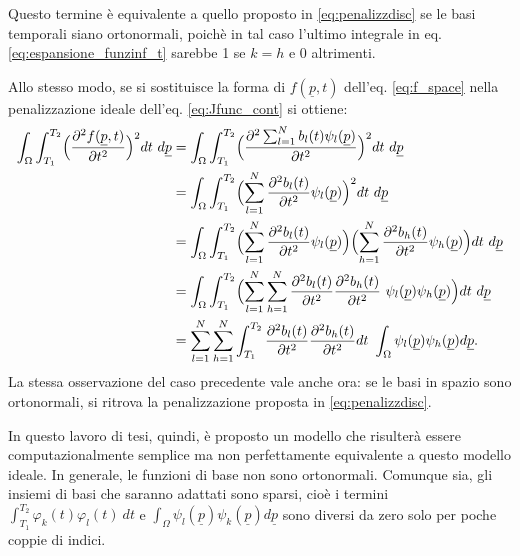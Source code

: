 \documentclass[a4paper,11pt,twoside,openright]{book}							%
\begin{document}
Questo termine è equivalente a quello proposto in \ref{eq:penalizzdisc} se le basi temporali siano ortonormali, poichè in tal caso l'ultimo integrale in eq. \ref{eq:espansione_funzinf_t} sarebbe 1 se $k=h$ e 0 altrimenti.

Allo stesso modo, se si sostituisce la forma di $f(\underline p,t)$ dell'eq. \ref{eq:f_space} nella penalizzazione ideale dell'eq. \ref{eq:Jfunc_cont} si ottiene:
\begin{equation} 
\label{eq:espansione_funzinf_sp}
\begin{split}
\int_\Omega \int_{T_1}^{T_2} \Bigl( \frac{\partial^2 f(\underline p, t) }{\partial t ^2} \Bigr)^2 dt\ d\underline p 
&=\int_\Omega \int_{T_1}^{T_2} \Bigl( \frac{\partial^2 \sum_{l=1}^N b_l(t)\psi_l(\underline p) }{\partial t ^2} \Bigr)^2 dt\ d\underline p \\
&=\int_\Omega \int_{T_1}^{T_2} \Bigl( \sum_{l=1}^N \frac{ \partial^2b_l(t)}{\partial t ^2}\psi_l(\underline p)  \Bigr)^2 dt\ d\underline p  \\
&=\int_\Omega \int_{T_1}^{T_2} \Bigl( \sum_{l=1}^N \frac{ \partial^2b_l(t)}{\partial t ^2}\psi_l(\underline p)  \Bigr)\Bigl( \sum_{h=1}^N \frac{ \partial^2b_h(t)}{\partial t ^2}\psi_h(\underline p)  \Bigr) dt\ d\underline p \\
&= \int_\Omega \int_{T_1}^{T_2} \Bigl( \sum_{l=1}^N \sum_{h=1}^N \frac{ \partial^2b_l(t)}{\partial t ^2}\frac{ \partial^2b_h(t)}{\partial t ^2}\   \psi_l(\underline p)  \psi_h(\underline p)  \Bigr) dt\ d\underline p \\
&=\sum_{l=1}^N \sum_{h=1}^N  \int_{T_1}^{T_2}  \frac{ \partial^2b_l(t)}{\partial t ^2}\frac{ \partial^2b_h(t)}{\partial t ^2}dt\  \int_\Omega \psi_l(\underline p)  \psi_h(\underline p)    d\underline p .
\end{split}
\end{equation}
La stessa osservazione del caso precedente vale anche ora: se le basi in spazio sono ortonormali, si ritrova la penalizzazione proposta in \ref{eq:penalizzdisc}. 

In questo lavoro di tesi, quindi, è proposto un modello che risulterà essere computazionalmente semplice ma non perfettamente equivalente a questo modello ideale. In generale, le funzioni di base non sono ortonormali. Comunque sia, gli insiemi di basi che saranno adattati sono sparsi, cioè i termini $ \int_{T_1}^{T_2} \varphi_k(t)\varphi_l(t)\ dt $ e $\int_\Omega \psi_l(\underline p)  \psi_k(\underline p)d\underline p$ sono diversi da zero solo per poche coppie di indici.
\end{document}

